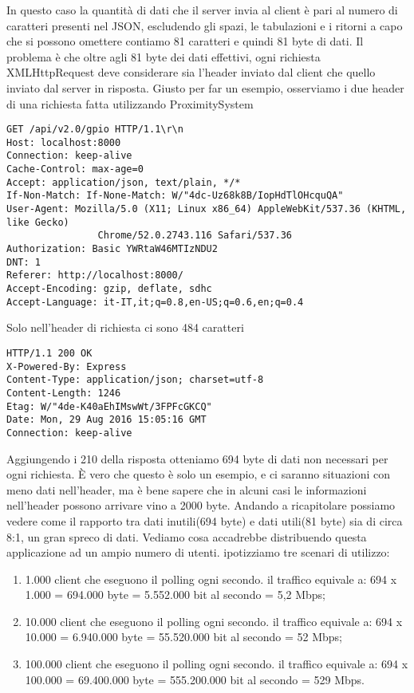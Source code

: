 In questo caso la quantità di dati che il server invia al client è pari al numero di caratteri presenti nel JSON, escludendo gli spazi, le tabulazioni e i ritorni a capo che si possono omettere contiamo 81 caratteri e quindi 81 byte di dati.
Il problema è che oltre agli 81 byte dei dati effettivi, ogni richiesta XMLHttpRequest deve considerare sia l'header inviato dal client che quello inviato dal server in risposta.
Giusto per far un esempio, osserviamo i due header di una richiesta fatta utilizzando ProximitySystem
\begin{lstlisting}[caption={header client}, style=javaScriptCode]
GET /api/v2.0/gpio HTTP/1.1\r\n
Host: localhost:8000
Connection: keep-alive
Cache-Control: max-age=0
Accept: application/json, text/plain, */*
If-Non-Match: If-None-Match: W/"4dc-Uz68k8B/IopHdTlOHcquQA"
User-Agent: Mozilla/5.0 (X11; Linux x86_64) AppleWebKit/537.36 (KHTML, like Gecko) 
				Chrome/52.0.2743.116 Safari/537.36
Authorization: Basic YWRtaW46MTIzNDU2
DNT: 1
Referer: http://localhost:8000/
Accept-Encoding: gzip, deflate, sdhc
Accept-Language: it-IT,it;q=0.8,en-US;q=0.6,en;q=0.4
\end{lstlisting}
Solo nell'header di richiesta ci sono 484 caratteri
\begin{lstlisting}[caption={header server}, style=javaScriptCode]
HTTP/1.1 200 OK
X-Powered-By: Express
Content-Type: application/json; charset=utf-8
Content-Length: 1246
Etag: W/"4de-K40aEhIMswWt/3FPFcGKCQ"
Date: Mon, 29 Aug 2016 15:05:16 GMT
Connection: keep-alive

\end{lstlisting} 
Aggiungendo i 210 della risposta otteniamo 694 byte di dati non necessari per ogni richiesta. 
È vero che questo è solo un esempio, e ci saranno situazioni con meno dati nell'header, ma è bene sapere che in alcuni casi le informazioni nell'header possono arrivare vino a 2000 byte.
Andando a ricapitolare possiamo vedere come il rapporto tra dati inutili(694 byte) e dati utili(81 byte) sia di  circa 8:1, un gran spreco di dati.
Vediamo cosa accadrebbe distribuendo questa applicazione ad un ampio numero di utenti. 
ipotizziamo tre scenari di utilizzo:
\begin{enumerate}
\item 1.000 client che eseguono il polling ogni secondo.
il traffico equivale a: 694 x 1.000 = 694.000 byte = 5.552.000 bit al secondo = 5,2 Mbps;
\item 10.000 client che eseguono il polling ogni secondo.
il traffico equivale a: 694 x 10.000 = 6.940.000 byte = 55.520.000 bit al secondo = 52 Mbps;
\item 100.000 client che eseguono il polling ogni secondo.
il traffico equivale a: 694 x 100.000 = 69.400.000 byte = 555.200.000 bit al secondo = 529 Mbps.
\end{enumerate}
